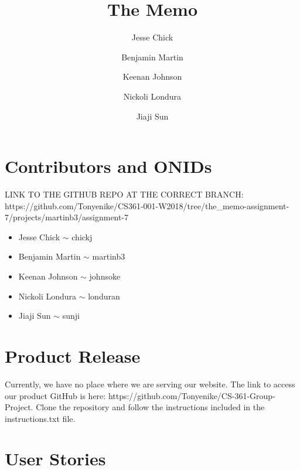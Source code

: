 \documentclass[12pt]{article}
\title{The Memo}
\author{Jesse Chick\\
\and Benjamin Martin\\
\and Keenan Johnson\\
\and Nickoli Londura\\
\and Jiaji Sun}
\begin{document}
\maketitle
\tableofcontents

\section{Contributors and ONIDs}
\par
LINK TO THE GITHUB REPO AT THE CORRECT BRANCH: https://github.com/Tonyenike/CS361-001-W2018/tree/the\_memo-assignment-7/projects/martinb3/assignment-7

\begin{itemize}
	\item Jesse Chick $\sim$ chickj
	\item Benjamin Martin $\sim$ martinb3
	\item Keenan Johnson $\sim$ johnsoke
	\item Nickoli Londura $\sim$ londuran
	\item Jiaji Sun $\sim$ sunji
\end{itemize}

\section{Product Release}

\par Currently, we have no place where we are serving our website. The link to access our product GitHub is here: https://github.com/Tonyenike/CS-361-Group-Project. Clone the repository and follow the instructions included in the instructions.txt file. \\

\section{User Stories}
\end{document}
